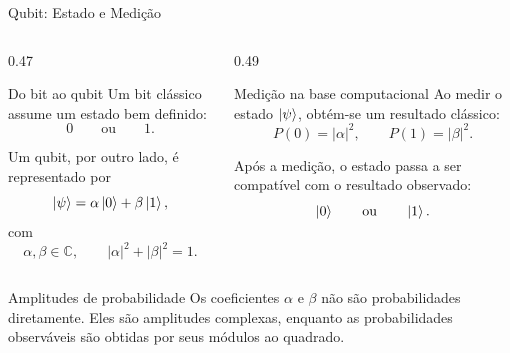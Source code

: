 \begin{frame}{Qubit: Estado e Medição \cite{nielsen2000quantum}}

\begin{columns}[T,onlytextwidth]

\begin{column}{0.47\textwidth}
  \begin{block}{Do bit ao qubit}
    Um bit clássico assume um estado bem definido:
    \[
      0
      \qquad \text{ou} \qquad
      1.
    \]

    Um qubit, por outro lado, é representado por
    \[
      \ket{\psi}
      =
      \alpha\ket{0}
      +
      \beta\ket{1},
    \]
    com
    \[
      \alpha,\beta\in\mathbb{C},
      \qquad
      |\alpha|^2+|\beta|^2=1.
    \]
  \end{block}
\end{column}

\begin{column}{0.49\textwidth}
  \begin{block}{Medição na base computacional}
    Ao medir o estado $\ket{\psi}$, obtém-se um resultado clássico:
    \[
      P(0)=|\alpha|^2,
      \qquad
      P(1)=|\beta|^2.
    \]

    Após a medição, o estado passa a ser compatível com o resultado
    observado:
    \[
      \ket{0}
      \qquad \text{ou} \qquad
      \ket{1}.
    \]
  \end{block}
\end{column}

\end{columns}

\vspace{0.3cm}

\begin{alertblock}{Amplitudes de probabilidade}
Os coeficientes $\alpha$ e $\beta$ não são probabilidades diretamente.
Eles são amplitudes complexas, enquanto as probabilidades observáveis são
obtidas por seus módulos ao quadrado.
\end{alertblock}

\end{frame}

